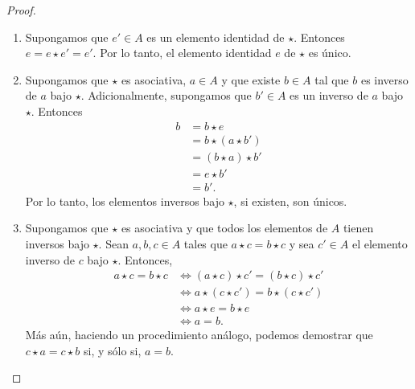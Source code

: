 \documentclass[apuntes]{subfiles}
\begin{document}
\begin{proof}\leavevmode
    
    \begin{enumerate}[label=(\alph*)]

        \item Supongamos que $e'\in A$ es un elemento identidad de $\star$. Entonces $e=e\star e'=e'$. Por lo tanto, el elemento identidad $e$ de $\star$ es único.

        \item Supongamos que $\star$ es asociativa, $a\in A$ y que existe $b\in A$ tal que $b$ es inverso de $a$ bajo $\star$. Adicionalmente, supongamos que $b'\in A$ es un inverso de $a$ bajo $\star$. Entonces
            \begin{align*}
                b &= b\star e \tag{$e$ es neutro} \\
                  &= b\star (a\star b') \tag{$b'$ es inverso de $a$} \\
                  &= (b\star a)\star b' \tag{$\star$ es asociativa} \\
                  &= e\star b' \tag{$b$ es inverso de $a$} \\
                  &= b'.
            \end{align*}
            Por lo tanto, los elementos inversos bajo $\star$, si existen, son únicos.

        \item Supongamos que $\star$ es asociativa y que todos los elementos de $A$ tienen inversos bajo $\star$. Sean $a,b,c\in A$ tales que $a\star c=b\star c$ y sea $c'\in A$ el elemento inverso de $c$ bajo $\star$. Entonces,
            \begin{align*}
                a\star c=b\star c &\iff (a\star c)\star c' = (b\star c)\star c' \\
                                  &\iff a\star(c\star c') = b\star(c\star c') \\
                                  &\iff a\star e = b\star e \\
                                  &\iff a = b.
            \end{align*}
            Más aún, haciendo un procedimiento análogo, podemos demostrar que $c\star a=c\star b$ si, y sólo si, $a=b$.
    \end{enumerate}
\end{proof}

\end{document}
